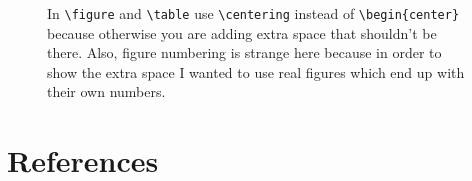 \documentclass[pharmbio, watermark]{pbpreprint}
\begin{document}
\begin{figure}
\hfill
{}
\caption{In \texttt{\textbackslash figure} and \texttt{\textbackslash table} use \texttt{\textbackslash centering} instead of \texttt{\textbackslash begin\{center\}} because otherwise you are adding extra space that shouldn't be there. Also, figure numbering is strange here because in order to show the extra space I wanted to use real figures which end up with their own numbers.}
\end{figure}

\section{References}
\printbibliography[heading=none]
\end{document}
